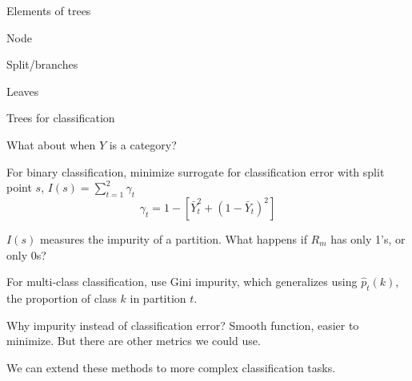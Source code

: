\documentclass[xcolor={table}, handout]{beamer}
\begin{document}

\begin{frame}{Elements of trees}


\begin{wideitemize}
\item Node\pause
\item Split/branches\pause
\item Leaves
\end{wideitemize}

\end{frame}



\begin{frame}{Trees for classification}

\begin{wideitemize}
\item What about when $Y$ is a category? \pause
\item For binary classification, minimize surrogate for classification error with split point $s$, $I(s) = \sum_{t = 1}^2 \gamma_t$
\[
\gamma_t = 1 - \left[\bar Y^2_t + (1-\bar Y_t)^2  \right]
\]\pause
\item $I(s)$ measures the impurity of a partition. \pause What happens if $R_m$ has only 1's, or only 0s?
\pause
\item For multi-class classification, use Gini impurity, which generalizes using $\hat p_t(k)$, the proportion of class $k$ in partition $t$.\pause
\item Why impurity instead of classification error? \pause Smooth function, easier to minimize. \pause But there are other metrics we could use. \pause
\item We can extend these methods to more complex classification tasks. 
\end{wideitemize}


\end{frame}


\end{document}
